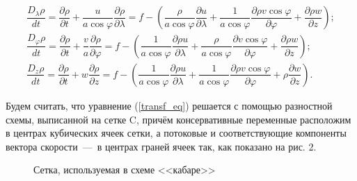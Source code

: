\documentclass[14pt, a4paper]{extarticle}
\begin{document}
\begin{gather}
\dfrac{D_\lambda \rho}{d t} = \dfrac{\partial \rho}{\partial t} + \dfrac{u}{a\cos\varphi}\dfrac{\partial\rho}{\partial\lambda} = f - \left(\dfrac{\rho}{a\cos\varphi} \dfrac{\partial u}{\partial\lambda} + \dfrac{1}{a\cos\varphi} \dfrac{\partial\rho v\cos\varphi}{\partial \varphi} + \dfrac{\partial \rho w}{\partial z}\right); \nonumber\\
\dfrac{D_\varphi \rho}{d t} = \dfrac{\partial \rho}{\partial t} + \dfrac{v}{a}\dfrac{\partial\rho}{\partial\varphi}  = f - \left(\dfrac{1}{a\cos\varphi}\dfrac{\partial \rho u}{\partial \lambda} + \dfrac{\rho}{a\cos\varphi} \dfrac{\partial v\cos\varphi}{\partial\varphi} + \dfrac{\partial \rho w}{\partial z}\right);\nonumber\\
\dfrac{D_z \rho}{d t} = \dfrac{\partial \rho}{\partial t} + w\dfrac{\partial\rho}{\partial z}  = f - \left(\dfrac{1}{a\cos\varphi}\dfrac{\partial \rho u}{\partial \lambda} + \dfrac{1}{a\cos\varphi} \dfrac{\partial\rho v\cos\varphi}{\partial \varphi} + \rho \dfrac{\partial w}{\partial z}\right).\label{adv_form}
\end{gather}

Будем считать, что уравнение (\ref{transf_eq}) решается с помощью разностной схемы, выписанной на сетке C, причём консервативные переменные расположим в центрах кубических ячеек сетки, а потоковые и соответствующие компоненты вектора скорости~---~в центрах граней ячеек так, как показано на рис. 2. 


\begin{figure}[H]

\caption{Сетка, используемая в схеме <<кабаре>>}
\end{figure}
\end{document}
